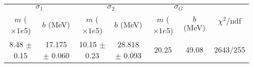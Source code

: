 \begin{tabular}{cc|cc|cc||c}
\multicolumn{2}{c|}{$\sigma_1$} & \multicolumn{2}{|c}{$\sigma_2$} & \multicolumn{2}{|c}{$\sigma_G$}  & \multirow{2}{*}{$\chi^2/$ndf}\\
$m$ ($\times1e5$) & $b$ (MeV) & $m$ ($\times1e5$) & $b$ (MeV) & $m$ ($\times1e5$) & $b$ (MeV) & \\
\hline
8.48 $\pm$ 0.15 & 17.175 $\pm$ 0.060 & 10.15 $\pm$ 0.23 & 28.818 $\pm$ 0.093 & 20.25 & 49.08 & 2643/255\\
\end{tabular}
